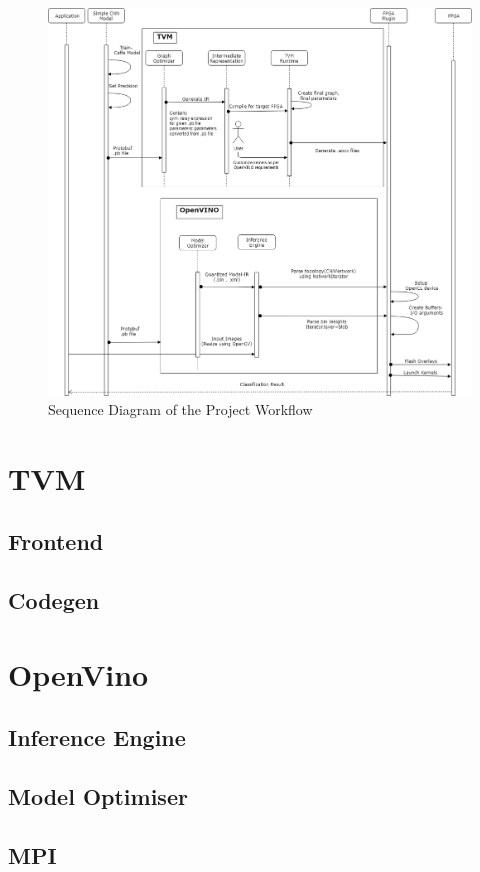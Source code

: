 \begin{figure}[h!]
    \centering
    \includegraphics[scale=0.4]{DesignDocument.png}
    \caption{Sequence Diagram of the Project Workflow}
\end{figure}

\section{TVM}
\subsection{Frontend}
\subsection{Codegen}

\section{OpenVino}
\subsection{Inference Engine}
\subsection{Model Optimiser}
\subsection{MPI}

